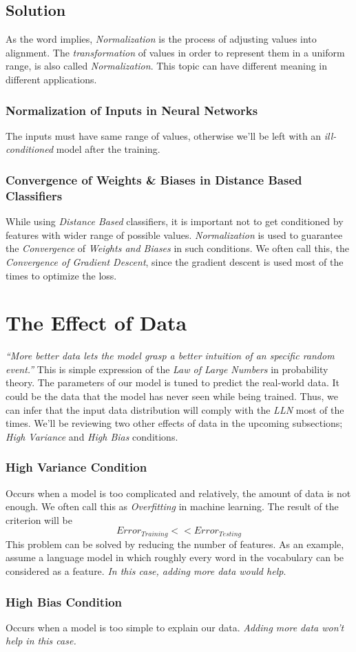 \documentclass[12pt]{article}
\numberwithin{equation}{section}
\numberwithin{table}{section}
\numberwithin{figure}{section}
\begin{document}
\subsection*{Solution}
As the word implies, \textit{Normalization} is the process of adjusting values into alignment. The \textit{transformation} of values in order to represent them in a uniform range, is also called \textit{Normalization}. This topic can have different meaning in different applications.
\subsubsection*{Normalization of Inputs in Neural Networks}
The inputs must have same range of values, otherwise we'll be left with an \textit{ill-conditioned} model after the training.

\subsubsection*{Convergence of Weights \& Biases in Distance Based Classifiers}
While using \textit{Distance Based} classifiers, it is important not to get conditioned by features with wider range of possible values. \textit{Normalization} is used to guarantee the \textit{Convergence} of \textit{Weights and Biases} in such conditions. We often call this, the \textit{Convergence of Gradient Descent}, since the gradient descent is used most of the times to optimize the loss.

\section{The Effect of Data}
  \textit{``More better data lets the model grasp a better intuition of an specific random event.''}
  This is simple expression of the \textit{Law of Large Numbers} in probability theory. The parameters of our model is tuned to predict the real-world data. It could be the data that the model has never seen while being trained. Thus, we can infer that the input data distribution will comply with the \textit{LLN} most of the times. We'll be reviewing two other effects of data in the upcoming subsections; \textit{High Variance} and \textit{High Bias} conditions.

\subsubsection*{High Variance Condition}
Occurs when a model is too complicated and relatively, the amount of data is not enough. We often call this as \textit{Overfitting} in machine learning.
The result of the criterion will be
$$
	Error_{Training} << Error_{Testing}
$$
This problem can be solved by reducing the number of features. As an example, assume a language model in which roughly every word in the vocabulary can be considered as a feature. \textit{In this case, adding more data would help}.

\subsubsection*{High Bias Condition}
Occurs when a model is too simple to explain our data. \textit{Adding more data won't help in this case.}
\end{document}

